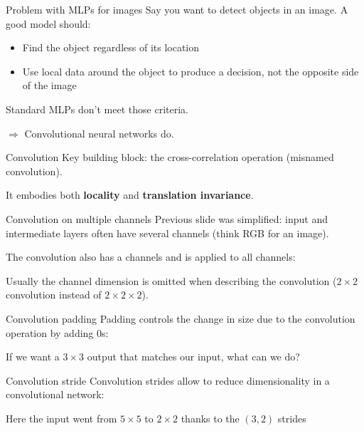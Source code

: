 \begin{frame}{Problem with MLPs for images}
  Say you want to detect objects in an image. A good model should:
  \begin{itemize}
    \item Find the object regardless of its location
    \item Use local data around the object to produce a decision, not the opposite side of the image
  \end{itemize}

  Standard MLPs don't meet those criteria.

  $\Rightarrow$ Convolutional neural networks do.
\end{frame}

\begin{frame}{Convolution}
  Key building block: the cross-correlation operation (misnamed convolution).

  It embodies both \textbf{locality} and \textbf{translation invariance}.

\end{frame}

\begin{frame}{Convolution on multiple channels}
  Previous slide was simplified: input and intermediate layers often have several channels (think RGB for an image).

  The convolution also has a channels and is applied to all channels:


  Usually the channel dimension is omitted when describing the convolution ($2 \times 2$ convolution instead of $2 \times 2 \times 2$).
\end{frame}

\begin{frame}{Convolution padding}
  Padding controls the change in size due to the convolution operation by adding $0$s:


  If we want a $3 \times 3$ output that matches our input, what can we do?
\end{frame}

\begin{frame}{Convolution stride}
  Convolution strides allow to reduce dimensionality in a convolutional network:


  Here the input went from $5 \times 5$ to $2 \times 2$ thanks to the $(3, 2)$ strides
\end{frame}

